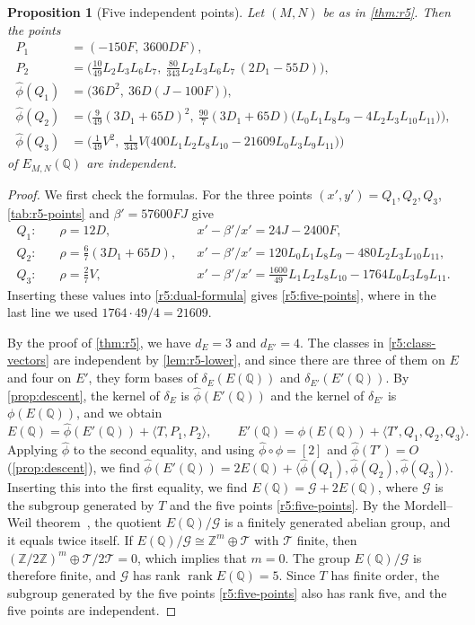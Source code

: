 \documentclass[12pt,oneside,openany]{book}
\theoremstyle{definition}
\theoremstyle{plain}
\numberwithin{equation}{chapter}
\theoremstyle{plain}
\newtheorem{proposition}[proposition]{Proposition}
\theoremstyle{definition}
\theoremstyle{remark}
\newcommand{\Q}{\mathbb Q}
\newcommand{\Z}{\mathbb Z}
\DeclareMathOperator{\rk}{rank}
\newcommand{\dual}{\hat\phi}
\begin{document}
\begin{proposition}[Five independent points]\label{prop:r5-five-points}
Let $(M,N)$ be as in \cref{thm:r5}. Then the points
\begin{equation}\label{r5:five-points}
\begin{aligned}
P_1&=(-150F,\ 3600DF),\\
P_2&=\Big(\tfrac{10}{49}L_2L_3L_6L_7,\ \tfrac{80}{343}L_2L_3L_6L_7\,(2D_1-55D)\Big),\\
\dual(Q_1)&=\big(36D^2,\ 36D(J-100F)\big),\\
\dual(Q_2)&=\Big(\tfrac9{49}(3D_1+65D)^2,\ \tfrac{90}7(3D_1+65D)\big(L_0L_1L_8L_9-4L_2L_3L_{10}L_{11}\big)\Big),\\
\dual(Q_3)&=\Big(\tfrac1{49}V^2,\ \tfrac1{343}V\big(400L_1L_2L_8L_{10}-21609L_0L_3L_9L_{11}\big)\Big)
\end{aligned}
\end{equation}
of $E_{M,N}(\Q)$ are independent.
\end{proposition}

\begin{proof}
We first check the formulas. For the three points $(x',y')=Q_1,Q_2,Q_3$, \cref{tab:r5-points} and $\beta'=57600FJ$ give
\[
\begin{aligned}
Q_1:&\quad \rho=12D, && x'-\beta'/x'=24J-2400F,\\
Q_2:&\quad \rho=\tfrac67(3D_1+65D), && x'-\beta'/x'=120L_0L_1L_8L_9-480L_2L_3L_{10}L_{11},\\
Q_3:&\quad \rho=\tfrac27V, && x'-\beta'/x'=\tfrac{1600}{49}L_1L_2L_8L_{10}-1764L_0L_3L_9L_{11}.
\end{aligned}
\]
Inserting these values into \eqref{r5:dual-formula} gives \eqref{r5:five-points}, where in the last line we used $1764\cdot49/4=21609$.

By the proof of \cref{thm:r5}, we have $d_E=3$ and $d_{E'}=4$. The classes in \eqref{r5:class-vectors} are independent by \cref{lem:r5-lower}, and since there are three of them on $E$ and four on $E'$, they form bases of $\delta_E(E(\Q))$ and $\delta_{E'}(E'(\Q))$. By \cref{prop:descent}, the kernel of $\delta_E$ is $\dual(E'(\Q))$ and the kernel of $\delta_{E'}$ is $\phi(E(\Q))$, and we obtain
\[
E(\Q)=\dual(E'(\Q))+\langle T,P_1,P_2\rangle,\qquad
E'(\Q)=\phi(E(\Q))+\langle T',Q_1,Q_2,Q_3\rangle.
\]
Applying $\dual$ to the second equality, and using $\dual\circ\phi=[2]$ and $\dual(T')=O$ (\cref{prop:descent}), we find $\dual(E'(\Q))=2E(\Q)+\langle\dual(Q_1),\dual(Q_2),\dual(Q_3)\rangle$. Inserting this into the first equality, we find $E(\Q)=\mathcal G+2E(\Q)$, where $\mathcal G$ is the subgroup generated by $T$ and the five points \eqref{r5:five-points}. By the Mordell--Weil theorem~\cite[Theorem~VIII.6.7]{SilvermanAEC}, the quotient $E(\Q)/\mathcal G$ is a finitely generated abelian group, and it equals twice itself.
If $E(\Q)/\mathcal G\cong\Z^m\oplus\mathcal T$ with $\mathcal T$ finite, then $(\Z/2\Z)^m\oplus\mathcal T/2\mathcal T=0$, which implies that $m=0$. The group $E(\Q)/\mathcal G$ is therefore finite, and $\mathcal G$ has rank $\rk E(\Q)=5$. Since $T$ has finite order, the subgroup generated by the five points \eqref{r5:five-points} also has rank five, and the five points are independent.
\end{proof}
\end{document}
